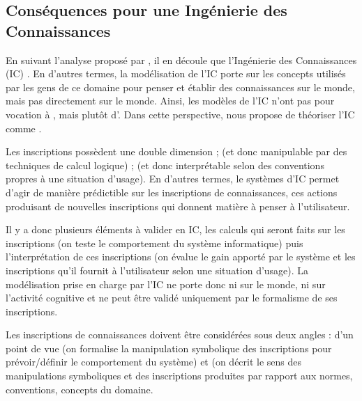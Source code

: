 \subsection{Conséquences pour une Ingénierie des Connaissances}
En suivant l'analyse proposé par \cite{Bachimont2004}, il en découle que  l'Ingénierie des Connaissances (IC) . 
En d'autres termes, la modélisation de l'IC porte sur les concepts utilisés par les gens de ce domaine pour penser et établir des connaissances sur le monde, mais pas directement sur le monde.
Ainsi, les modèles de l'IC n'ont pas pour vocation à , mais plutôt d'. 
Dans cette perspective, \citeauthor{Bachimont2004} nous propose de théoriser l'IC comme . 
        
Les inscriptions possèdent une double dimension ;  (et donc manipulable par des techniques de calcul logique) ;  (et donc interprétable selon des conventions propres à une situation d'usage).  
En d'autres termes, le systèmes d'IC permet d'agir de manière prédictible sur les inscriptions de connaissances, ces actions produisant de nouvelles inscriptions qui donnent matière à penser à l'utilisateur. 
        
Il y a donc plusieurs éléments à valider en IC, les calculs qui seront faits sur les inscriptions (on teste le comportement du système informatique) puis l'interprétation de ces inscriptions (on évalue le gain apporté par le système et les inscriptions qu'il fournit à l'utilisateur selon une situation d'usage). 
La modélisation prise en charge par l'IC ne porte donc ni sur le monde, ni sur l'activité cognitive et ne peut être validé uniquement par le formalisme de ses inscriptions. 
        
Les inscriptions de connaissances doivent être considérées sous deux angles : d'un point de vue  (on formalise la manipulation symbolique des inscriptions pour prévoir/définir le comportement du système) et  (on décrit le sens des manipulations symboliques et des inscriptions produites par rapport aux normes, conventions, concepts du domaine.









